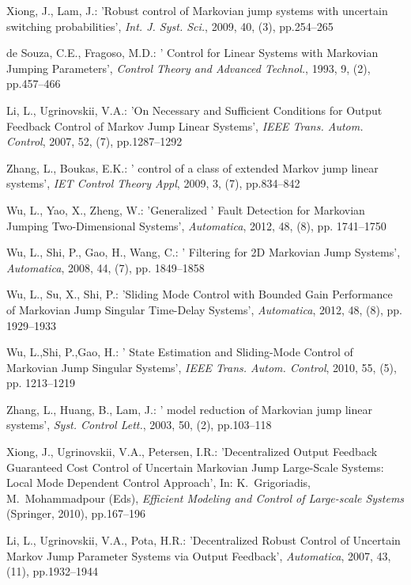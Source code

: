 \documentclass[11pt,draftcls,onecolumn]{IEEEtran}
\begin{document}
\begin{thebibliography}{0}
Xiong, J., Lam, J.: 'Robust  control of Markovian jump systems with uncertain switching probabilities', \emph{Int. J. Syst. Sci.},  2009, 40, (3), pp.254--265



de Souza, C.E., Fragoso,  M.D.: ' Control for Linear Systems with Markovian Jumping Parameters', \emph{Control Theory and Advanced Technol.}, 1993, 9, (2), pp.457--466



Li, L.,  Ugrinovskii, V.A.: 'On Necessary and Sufficient Conditions for  Output Feedback Control of Markov Jump Linear Systems', \emph{IEEE Trans. Autom. Control}, 2007, 52, (7), pp.1287--1292

Zhang, L., Boukas, E.K.: ' control of a class of extended Markov jump linear systems', \emph{IET Control Theory Appl}, 2009, 3, (7), pp.834--842

 Wu, L., Yao, X., Zheng, W.: 'Generalized ' Fault Detection for Markovian Jumping
Two-Dimensional Systems', \emph{Automatica}, 2012, 48, (8), pp. 1741--1750

Wu, L., Shi, P., Gao, H., Wang, C.: ' Filtering for 2D Markovian Jump Systems', \emph{Automatica}, 2008, 44, (7), pp. 1849--1858

 Wu, L., Su, X., Shi, P.: 'Sliding Mode Control with Bounded  Gain Performance of Markovian
Jump Singular Time-Delay Systems', \emph{Automatica}, 2012, 48, (8), pp.
1929--1933

 Wu, L.,Shi, P.,Gao, H.: ' State Estimation and Sliding-Mode Control of Markovian Jump
Singular Systems', \emph{IEEE Trans. Autom. Control}, 2010, 55, (5), pp. 1213--1219

Zhang, L., Huang, B., Lam, J.: ' model reduction of Markovian jump
linear systems', \emph{Syst. Control Lett.}, 2003, 50, (2), pp.103--118

Xiong, J., Ugrinovskii, V.A., Petersen, I.R.: 'Decentralized Output Feedback Guaranteed Cost Control of Uncertain Markovian Jump Large-Scale Systems: Local Mode Dependent Control Approach', In: K.~Grigoriadis, M.~Mohammadpour (Eds), \emph{Efficient Modeling and Control of Large-scale Systems} (Springer, 2010), pp.167--196



Li, L., Ugrinovskii, V.A., Pota, H.R.: 'Decentralized Robust Control of Uncertain Markov Jump Parameter Systems via Output Feedback', \emph{Automatica}, 2007, 43, (11), pp.1932--1944


\end{thebibliography}
\end{document}

